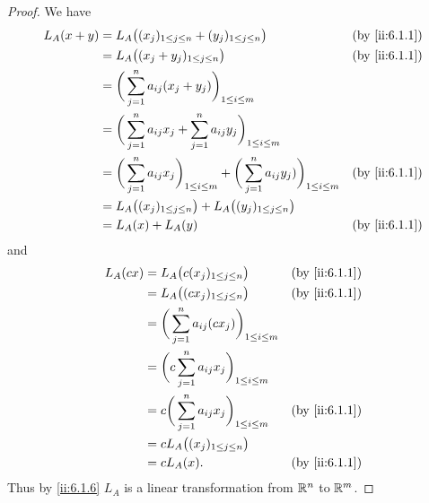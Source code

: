 \begin{proof}
  We have
  \begin{align*}
    L_A(x + y) & = L_A\big((x_j)_{1 \leq j \leq n} + (y_j)_{1 \leq j \leq n}\big)                                                     &  & \by{ii:6.1.1} \\
               & = L_A\big((x_j + y_j)_{1 \leq j \leq n}\big)                                                                         &  & \by{ii:6.1.1} \\
               & = \bigg(\sum_{j = 1}^n a_{ij} (x_j + y_j)\bigg)_{1 \leq i \leq m}                                                                       \\
               & = \bigg(\sum_{j = 1}^n a_{ij} x_j + \sum_{j = 1}^n a_{ij} y_j\bigg)_{1 \leq i \leq m}                                                   \\
               & = \bigg(\sum_{j = 1}^n a_{ij} x_j\bigg)_{1 \leq i \leq m} + \bigg(\sum_{j = 1}^n a_{ij} y_j)\bigg)_{1 \leq i \leq m} &  & \by{ii:6.1.1} \\
               & = L_A\big((x_j)_{1 \leq j \leq n}\big) + L_A\big((y_j)_{1 \leq j \leq n}\big)                                                           \\
               & = L_A(x) + L_A(y)                                                                                                    &  & \by{ii:6.1.1}
  \end{align*}
  and
  \begin{align*}
    L_A(cx) & = L_A\big(c(x_j)_{1 \leq j \leq n}\big)                       &  & \by{ii:6.1.1} \\
            & = L_A\big((cx_j)_{1 \leq j \leq n}\big)                       &  & \by{ii:6.1.1} \\
            & = \bigg(\sum_{j = 1}^n a_{ij} (c x_j)\bigg)_{1 \leq i \leq m}                    \\
            & = \bigg(c \sum_{j = 1}^n a_{ij} x_j\bigg)_{1 \leq i \leq m}                      \\
            & = c \bigg(\sum_{j = 1}^n a_{ij} x_j\bigg)_{1 \leq i \leq m}   &  & \by{ii:6.1.1} \\
            & = c L_A\big((x_j)_{1 \leq j \leq n}\big)                                         \\
            & = c L_A(x).                                                   &  & \by{ii:6.1.1}
  \end{align*}
  Thus by \cref{ii:6.1.6} \(L_A\) is a linear transformation from \(\mathbb{R}^n\) to \(\mathbb{R}^m\).
\end{proof}


